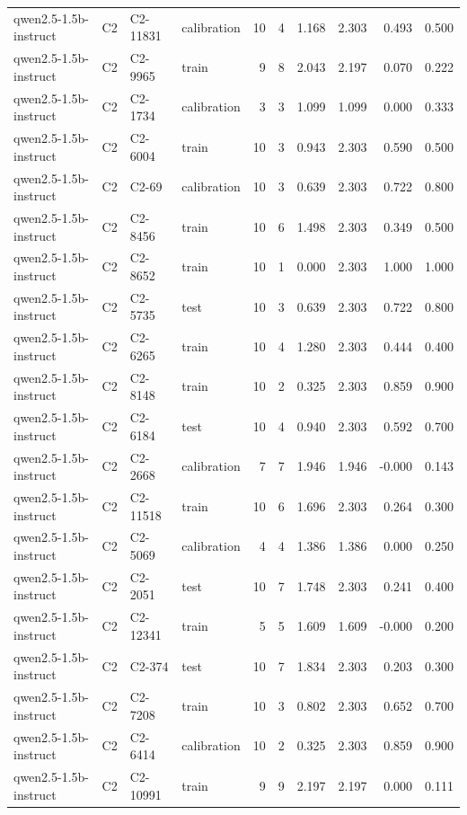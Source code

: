 \begin{table}
\begin{tabular}{llllrrrrrr}
qwen2.5-1.5b-instruct & C2 & C2-11831 & calibration & 10 & 4 & 1.168 & 2.303 & 0.493 & 0.500 \\
qwen2.5-1.5b-instruct & C2 & C2-9965 & train & 9 & 8 & 2.043 & 2.197 & 0.070 & 0.222 \\
qwen2.5-1.5b-instruct & C2 & C2-1734 & calibration & 3 & 3 & 1.099 & 1.099 & 0.000 & 0.333 \\
qwen2.5-1.5b-instruct & C2 & C2-6004 & train & 10 & 3 & 0.943 & 2.303 & 0.590 & 0.500 \\
qwen2.5-1.5b-instruct & C2 & C2-69 & calibration & 10 & 3 & 0.639 & 2.303 & 0.722 & 0.800 \\
qwen2.5-1.5b-instruct & C2 & C2-8456 & train & 10 & 6 & 1.498 & 2.303 & 0.349 & 0.500 \\
qwen2.5-1.5b-instruct & C2 & C2-8652 & train & 10 & 1 & 0.000 & 2.303 & 1.000 & 1.000 \\
qwen2.5-1.5b-instruct & C2 & C2-5735 & test & 10 & 3 & 0.639 & 2.303 & 0.722 & 0.800 \\
qwen2.5-1.5b-instruct & C2 & C2-6265 & train & 10 & 4 & 1.280 & 2.303 & 0.444 & 0.400 \\
qwen2.5-1.5b-instruct & C2 & C2-8148 & train & 10 & 2 & 0.325 & 2.303 & 0.859 & 0.900 \\
qwen2.5-1.5b-instruct & C2 & C2-6184 & test & 10 & 4 & 0.940 & 2.303 & 0.592 & 0.700 \\
qwen2.5-1.5b-instruct & C2 & C2-2668 & calibration & 7 & 7 & 1.946 & 1.946 & -0.000 & 0.143 \\
qwen2.5-1.5b-instruct & C2 & C2-11518 & train & 10 & 6 & 1.696 & 2.303 & 0.264 & 0.300 \\
qwen2.5-1.5b-instruct & C2 & C2-5069 & calibration & 4 & 4 & 1.386 & 1.386 & 0.000 & 0.250 \\
qwen2.5-1.5b-instruct & C2 & C2-2051 & test & 10 & 7 & 1.748 & 2.303 & 0.241 & 0.400 \\
qwen2.5-1.5b-instruct & C2 & C2-12341 & train & 5 & 5 & 1.609 & 1.609 & -0.000 & 0.200 \\
qwen2.5-1.5b-instruct & C2 & C2-374 & test & 10 & 7 & 1.834 & 2.303 & 0.203 & 0.300 \\
qwen2.5-1.5b-instruct & C2 & C2-7208 & train & 10 & 3 & 0.802 & 2.303 & 0.652 & 0.700 \\
qwen2.5-1.5b-instruct & C2 & C2-6414 & calibration & 10 & 2 & 0.325 & 2.303 & 0.859 & 0.900 \\
qwen2.5-1.5b-instruct & C2 & C2-10991 & train & 9 & 9 & 2.197 & 2.197 & 0.000 & 0.111 \\

\end{tabular}
\end{table}

